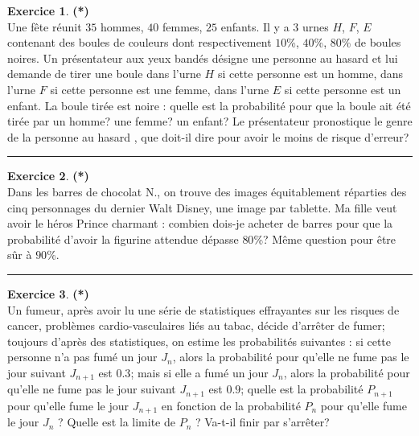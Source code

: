 \documentclass[a4paper,11pt]{article}
\theoremstyle{definition}
\newtheorem{exo}{Exercice} %
\begin{document}
\begin{minipage}{1\linewidth}\begin{minipage}[t]{0.48\linewidth}\raggedright
		

		
		\begin{exo}\textbf{(*)}\quad\\[0.2cm]
			Une fête réunit $35$ hommes, $40$ femmes, $25$ enfants. Il y a $3$ urnes $H$, $F$, $E$ contenant des boules de couleurs dont
			respectivement $10$\%, $40$\%, $80$\% de boules noires. Un présentateur
			aux yeux bandés désigne une personne au hasard et lui demande de
			tirer une boule dans l'urne $H$ si cette personne est un homme, dans l'urne $F$
			si cette personne est une femme, dans l'urne $E$ si cette personne est un
			enfant. La boule tirée est noire : quelle est la probabilité pour que
			la boule ait été tirée par un homme? une femme? un enfant? Le présentateur pronostique le genre de la personne au hasard , que doit-il dire pour avoir le moins de risque d'erreur?
			
			
			\centering\rule{1\linewidth}{0.6pt}\end{exo}
		
			\begin{exo}\textbf{(*)}\quad\\[0.2cm]
			Dans les barres de chocolat N., on trouve des images équitablement
			réparties des cinq personnages du dernier Walt Disney, une image par
			tablette. Ma fille veut avoir le héros Prince charmant : combien dois-je
			acheter de barres pour que la probabilité d'avoir la figurine attendue dépasse $80$\%? 
			Même question pour être sûr à $90$\%.
			
			\centering\rule{1\linewidth}{0.6pt}\end{exo}
		
		
		
		
		
		
		
		
	\end{minipage}\hfill\vrule\hfill\begin{minipage}[t]{0.48\linewidth}\raggedright
		
			\begin{exo}\textbf{(*)}\quad\\[0.2cm]
			Un fumeur, après avoir lu une série de statistiques
			effrayantes sur les risques de cancer, problèmes cardio-vasculaires 
			liés au tabac, décide d'arrêter de fumer; toujours d'après des
			statistiques, on estime les probabilités suivantes : si cette personne
			n'a pas fumé un jour $J_{n}$, alors la probabilité
			pour qu'elle ne fume pas le jour suivant $J_{n+1}$ est $0.3$; 
			mais si elle a fumé un jour $J_{n}$, alors la probabilité 
			pour qu'elle ne fume pas le jour suivant $J_{n+1}$ est $0.9$; 
			quelle est la probabilité $P_{n+1}$ pour qu'elle
			fume le jour $J_{n+1}$ en fonction de la probabilité 
			$P_{n}$ pour qu'elle fume le jour $J_{n}$ ? Quelle est la
			limite de $P_{n}$ ? Va-t-il finir par s'arrêter?
			

\end{exo}
\end{minipage}
\end{minipage}
\end{document}
